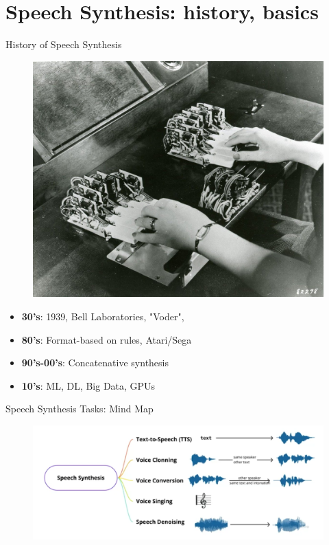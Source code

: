 \section{Speech Synthesis: history, basics}
\begin{frame}{History of Speech Synthesis}
	\begin{figure}
		\centering
		\includegraphics[width=0.6\linewidth]{figs/voder.png}
	\end{figure}
	\begin{itemize}
		\item \textbf{30's}: 1939, Bell Laboratories, "Voder",
		\item \textbf{80's}: Format-based on rules, Atari/Sega
		\item \textbf{90's-00's}: Concatenative synthesis
		\item \textbf{10's}: ML, DL, Big Data, GPUs
	\end{itemize}
\end{frame}
\begin{frame}{Speech Synthesis Tasks: Mind Map}
	\begin{figure}
		\centering
		\includegraphics[width=0.99\linewidth]{figs/tasks_3.png}
	\end{figure}
\end{frame}

